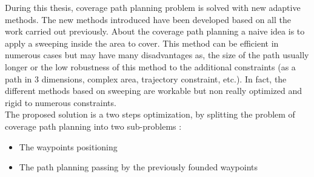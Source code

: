 During this thesis, coverage path planning problem is solved with new adaptive methods. The new methods introduced have been developed based on all the work carried out previously. 
About the coverage path planning a naive idea is to apply a sweeping inside the area to cover. This method can be efficient in numerous cases but may have many disadvantages as, the size of the path usually longer
or the low robustness of this method to the additional constraints (as a path in 3 dimensions, complex area, trajectory constraint, etc.). In fact, the different methods based on sweeping are workable but non really optimized and rigid to numerous constraints. \\
The proposed solution is a two steps optimization, by splitting the problem of coverage path planning into two sub-problems : 
\begin{itemize}
\item The waypoints positioning 
\item The path planning passing by the previously founded waypoints
\end{itemize} 
